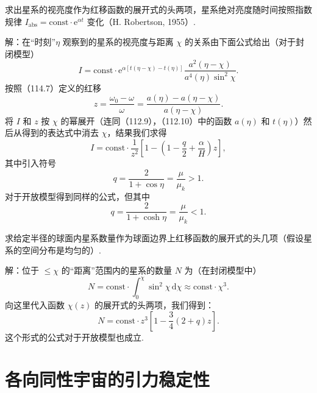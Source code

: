\begin{xiti}

\quad 求出星系的视亮度作为红移函数的展开式的头两项，星系绝对亮度随时间按照指数规律 $I_{\mathrm{abs}}=\mathrm{const}\cdot\mathrm{e}^{\alpha t}$ 变化（H. Robertson, 1955）.

解：在“时刻”$\eta$ 观察到的星系的视亮度与距离 $\chi$ 的关系由下面公式给出（对于封闭模型）
\begin{equation*}
  I=\mathrm{const}\cdot\mathrm{e}^{\alpha[t(\eta-\chi)-t(\eta)]}
  \frac{a^{2}(\eta-\chi)}{a^{4}(\eta)\sin^{2}\chi}.
\end{equation*}
按照（114.7）定义的红移
\begin{equation*}
  z=\frac{\omega_{0}-\omega}{\omega}
  =\frac{a(\eta)-a(\eta-\chi)}{a(\eta-\chi)}.
\end{equation*}
将 $I$ 和 $z$ 按 $\chi$ 的幂展开（连同（112.9），（112.10）中的函数 $a(\eta)$ 和 $t(\eta)$）然后从得到的表达式中消去 $\chi$，结果我们求得
\begin{equation*}
  I=\mathrm{const}\cdot\frac{1}{z^{2}}
  \left[1-\left(1-\frac{q}{2}+\frac{\alpha}{H}\right)z\right],
\end{equation*}
其中引入符号
\begin{equation*}
  q=\frac{2}{1+\cos\eta}=\frac{\mu}{\mu_{k}}>1.
\end{equation*}
对于开放模型得到同样的公式，但其中
\begin{equation*}
  q=\frac{2}{1+\cosh\eta}=\frac{\mu}{\mu_{k}}<1.
\end{equation*}

\quad 求给定半径的球面内星系数量作为球面边界上红移函数的展开式的头几项（假设星系的空间分布是均匀的）.

解：位于 $\leqslant\chi$ 的“距离”范围内的星系的数量 $N$ 为（在封闭模型中）
\begin{equation*}
  N=\mathrm{const}\cdot\int_{0}^{\chi}\sin^{2}\chi\,\mathrm{d}\chi
  \approx\mathrm{const}\cdot\chi^{3}.
\end{equation*}
向这里代入函数 $\chi(z)$ 的展开式的头两项，我们得到：
\begin{equation*}
  N=\mathrm{const}\cdot z^{3}
  \left[1-\frac{3}{4}(2+q)z\right].
\end{equation*}
这个形式的公式对于开放模型也成立.

\end{xiti}

\section{各向同性宇宙的引力稳定性}

